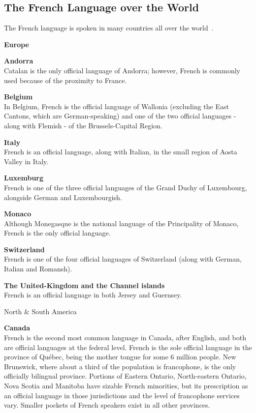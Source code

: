 \begin{multicols}{2}
\subsection{The French Language over the World}
\label{frenchLanguageInTheWorldEn}
The French language is spoken in many countries all over the world~\cite{francais}.

\vspace{1cm}
\begin{center}
{\bf {\sc Europe}}
\end{center}

{\bf Andorra}\\
Catalan is the only official language of Andorra; however, French is
commonly used because of the proximity to France.

{\bf Belgium}\\ 
In Belgium, French is the official language of Wallonia (excluding the
East Cantons, which are German-speaking) and one of the two official
languages - along with Flemish - of the Brussels-Capital Region.

{\bf Italy}\\
French is an official language, along with Italian, in the small region of Aosta Valley in Italy.

{\bf Luxemburg}\\
French is one of the three official languages of the Grand Duchy of Luxembourg, alongside German and Luxembourgish.

{\bf Monaco}\\ 
Although Monegasque is the national language of the Principality of
Monaco, French is the only official language.

{\bf Switzerland}\\
French is one of the four official languages of Switzerland (along with German, Italian and Romansh).

{\bf The United-Kingdom and the Channel islands}\\
French is an official language in both Jersey and Guernsey.

\begin{center}
{\sc North \& South America}
\end{center}

{\bf Canada}\\
French is the second most common language in Canada, after English,
and both are official languages at the federal level. French is the
sole official language in the province of Québec, being the mother
tongue for some 6 million people. New Brunswick, where about a third
of the population is francophone, is the only officially bilingual
province. Portions of Eastern Ontario, North-eastern Ontario, Nova
Scotia and Manitoba have sizable French minorities, but its
prescription as an official language in those jurisdictions and the
level of francophone services vary. Smaller pockets of French speakers
exist in all other provinces.


\end{multicols}
